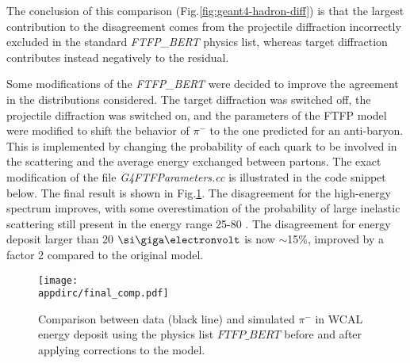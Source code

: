 The conclusion of this comparison (Fig.\ref{fig:geant4-hadron-diff}) is that the largest contribution to the disagreement comes from the projectile diffraction incorrectly excluded in the standard \textit{FTFP\_BERT} physics list, whereas target diffraction contributes instead negatively to the residual.

Some modifications of the \textit{FTFP\_BERT} were decided to improve the agreement in the distributions considered. The target diffraction was switched off, the projectile diffraction was switched on, and the parameters of the FTFP model were modified to shift the behavior of $\pi^-$ to the one predicted for an anti-baryon. This is implemented by changing the probability of each quark to be involved in the scattering and the average energy exchanged between partons. The exact modification of the file \textit{G4FTFParameters.cc} is illustrated in the code snippet below. The final result is shown in Fig.\ref{fig:geant4-hadron-final}. The disagreement for the high-energy spectrum improves, with some overestimation of the probability of large inelastic scattering still present in the energy range 25-80 \gev. The disagreement for energy deposit larger than 20 $\gev$ is now $\sim$15\%, improved by a factor 2 compared to the original model.

\begin{figure}[tbh!]
  \centering
  \texttt{[image: \\appdirc/final\_comp.pdf]}
  \caption[Comparison of hadron energy deposit after corrections]{Comparison between data (black line) and simulated $\pi^-$ in WCAL energy deposit using the physics list $FTFP\_BERT$ before and after applying corrections to the model.}
  \label{fig:geant4-hadron-final}
\end{figure}

